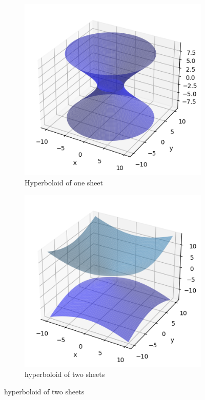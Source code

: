\begin{figure}[h]
    \centering
    \begin{subfigure}[l]{0.4\textwidth}
        \centering
        \includegraphics[scale=0.6]{Rn_function/onesheet.png}
        \caption{Hyperboloid of one sheet}
    \end{subfigure}
    \begin{subfigure}[r]{0.4\textwidth}
        \centering
        \includegraphics[scale=0.6]{Rn_function/twosheet.png}
        \caption{hyperboloid of two sheets}
    \end{subfigure}
\end{figure}
